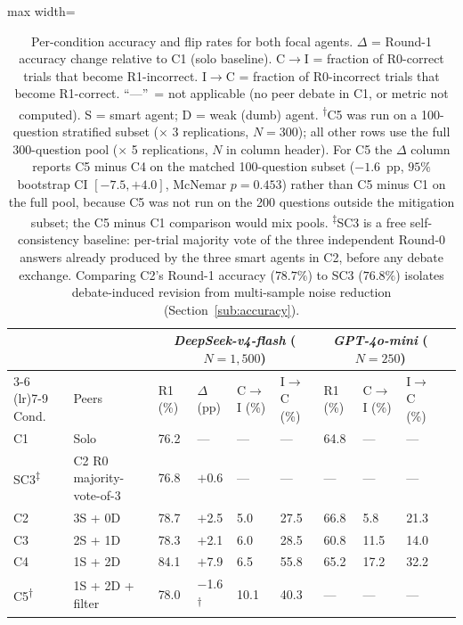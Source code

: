 \documentclass[review,3p,authoryear]{elsarticle}
\begin{document}
\begin{table}[t]
\centering
\small
\caption{Per-condition accuracy and flip rates for both focal agents.
$\Delta$ = Round-1 accuracy change relative to C1 (solo baseline).
C$\to$I = fraction of R0-correct trials that become R1-incorrect.
I$\to$C = fraction of R0-incorrect trials that become R1-correct.
``---''~= not applicable (no peer debate in C1, or metric not computed).
S = smart agent; D = weak (dumb) agent.
\textsuperscript{$\dagger$}C5 was run on a 100-question stratified
subset ($\times$ 3 replications, $N = 300$); all other rows use the
full 300-question pool ($\times$ 5 replications, $N$ in column
header). For C5 the $\Delta$ column reports C5 minus C4 on the
matched 100-question subset ($-1.6$~pp, $95\%$ bootstrap CI $[-7.5,
+4.0]$, McNemar $p = 0.453$) rather than C5 minus C1 on the full
pool, because C5 was not run on the 200 questions outside the
mitigation subset; the C5 minus C1 comparison would mix pools.
\textsuperscript{$\ddagger$}SC3 is a free self-consistency baseline:
per-trial majority vote of the three independent Round-0 answers
already produced by the three smart agents in C2, before any debate
exchange. Comparing C2's Round-1 accuracy ($78.7\%$) to SC3 ($76.8\%$)
isolates debate-induced revision from multi-sample noise reduction
(Section~\ref{sub:accuracy}).
\label{tab:conditions}}
\begin{adjustbox}{max width=\linewidth}
\begin{tabular}{@{}llllllllll@{}}
\toprule
 & & \multicolumn{4}{c}{\textit{DeepSeek-v4-flash} ($N=1{,}500$)} &
       \multicolumn{3}{c}{\textit{GPT-4o-mini} ($N=250$)} \\
\cmidrule(lr){3-6} \cmidrule(lr){7-9}
Cond. & Peers & R1 (\%) & $\Delta$ (pp) & C$\to$I (\%) & I$\to$C (\%) &
                R1 (\%) & C$\to$I (\%) & I$\to$C (\%) \\
\midrule
C1 & Solo        & 76.2 & ---    & ---  & ---  & 64.8 & ---  & ---  \\
SC3\textsuperscript{$\ddagger$} & C2 R0 majority-vote-of-3 & 76.8 & $+$0.6 & --- & --- & --- & --- & --- \\
C2 & 3S + 0D     & 78.7 & $+$2.5 & 5.0  & 27.5 & 66.8 & 5.8  & 21.3 \\
C3 & 2S + 1D     & 78.3 & $+$2.1 & 6.0  & 28.5 & 60.8 & 11.5 & 14.0 \\
C4 & 1S + 2D     & 84.1 & $+$7.9 & 6.5  & 55.8 & 65.2 & 17.2 & 32.2 \\
C5\textsuperscript{$\dagger$} & 1S + 2D + filter & 78.0 & $-$1.6\textsuperscript{$\dagger$} & 10.1 & 40.3 & ---  & ---  & ---  \\
\bottomrule
\end{tabular}
\end{adjustbox}
\end{table}
\end{document}
